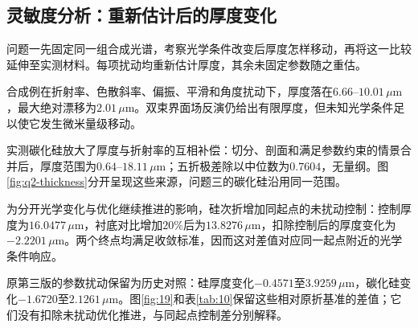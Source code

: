 \subsection{灵敏度分析：重新估计后的厚度变化}
\label{sec:sensitivity-analysis}

问题一先固定同一组合成光谱，考察光学条件改变后厚度怎样移动，再将这一比较延伸至实测材料。每项扰动均重新估计厚度，其余未固定参数随之重估。

合成例在折射率、色散斜率、偏振、平滑和角度扰动下，厚度落在$6.66$--$10.01\,\mu\mathrm{m}$，最大绝对漂移为$2.01\,\mu\mathrm{m}$。双束界面场反演仍给出有限厚度，但未知光学条件足以使它发生微米量级移动。

实测碳化硅放大了厚度与折射率的互相补偿：切分、剖面和满足参数约束的情景合并后，厚度范围为$0.64$--$18.11\,\mu\mathrm{m}$；五折极差除以中位数为$0.7604$，无量纲。图\ref{fig:q2-thickness}分开呈现这些来源，问题三的碳化硅沿用同一范围。

为分开光学变化与优化继续推进的影响，硅次折增加同起点的未扰动控制：控制厚度为$16.0477\,\mu\mathrm{m}$，衬底对比增加$20\%$后为$13.8276\,\mu\mathrm{m}$，扣除控制后的厚度变化为$-2.2201\,\mu\mathrm{m}$。两个终点均满足收敛标准，因而这对差值对应同一起点附近的光学条件响应。

原第三版的参数扰动保留为历史对照：硅厚度变化$-0.4571$至$3.9259\,\mu\mathrm{m}$，碳化硅变化$-1.6720$至$2.1261\,\mu\mathrm{m}$。图\ref{fig:19}和表\ref{tab:10}保留这些相对原折基准的差值；它们没有扣除未扰动优化推进，与同起点控制差分别解释。

